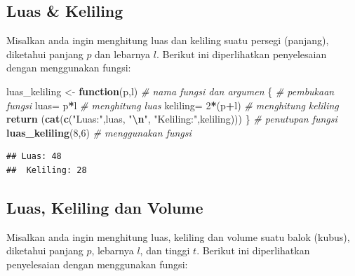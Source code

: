 \documentclass[
]{book}
\newenvironment{Shaded}{\begin{snugshade}}{\end{snugshade}}
\newcommand{\CommentTok}[1]{\textcolor[rgb]{0.56,0.35,0.01}{\textit{#1}}}
\newcommand{\ControlFlowTok}[1]{\textcolor[rgb]{0.13,0.29,0.53}{\textbf{#1}}}
\newcommand{\DecValTok}[1]{\textcolor[rgb]{0.00,0.00,0.81}{#1}}
\newcommand{\FunctionTok}[1]{\textcolor[rgb]{0.13,0.29,0.53}{\textbf{#1}}}
\newcommand{\NormalTok}[1]{#1}
\newcommand{\OtherTok}[1]{\textcolor[rgb]{0.56,0.35,0.01}{#1}}
\newcommand{\SpecialCharTok}[1]{\textcolor[rgb]{0.81,0.36,0.00}{\textbf{#1}}}
\newcommand{\StringTok}[1]{\textcolor[rgb]{0.31,0.60,0.02}{#1}}
\begin{document}
\hypertarget{luas-keliling}{%
\subsection{Luas \& Keliling}\label{luas-keliling}}

Misalkan anda ingin menghitung luas dan keliling suatu persegi (panjang), diketahui panjang \(p\) dan lebarnya \(l\). Berikut ini diperlihatkan penyelesaian dengan menggunakan fungsi:

\begin{Shaded}
\begin{Highlighting}[]
\NormalTok{luas\_keliling }\OtherTok{\textless{}{-}} \ControlFlowTok{function}\NormalTok{(p,l)               }\CommentTok{\# nama fungsi dan argumen}
\NormalTok{\{                                            }\CommentTok{\# pembukaan fungsi}
\NormalTok{  luas}\OtherTok{=}\NormalTok{ p}\SpecialCharTok{*}\NormalTok{l                                  }\CommentTok{\# menghitung luas}
\NormalTok{  keliling}\OtherTok{=} \DecValTok{2}\SpecialCharTok{*}\NormalTok{(p}\SpecialCharTok{+}\NormalTok{l)                          }\CommentTok{\# menghitung keliling}
  \FunctionTok{return}\NormalTok{ (}\FunctionTok{cat}\NormalTok{(}\FunctionTok{c}\NormalTok{(}\StringTok{"Luas:"}\NormalTok{,luas, }\StringTok{"}\SpecialCharTok{\textbackslash{}n}\StringTok{"}\NormalTok{, }
             \StringTok{"Keliling:"}\NormalTok{,keliling)))  }
\NormalTok{\}                                            }\CommentTok{\# penutupan fungsi}
\FunctionTok{luas\_keliling}\NormalTok{(}\DecValTok{8}\NormalTok{,}\DecValTok{6}\NormalTok{)                           }\CommentTok{\# menggunakan fungsi}
\end{Highlighting}
\end{Shaded}

\begin{verbatim}
## Luas: 48 
##  Keliling: 28
\end{verbatim}

\hypertarget{luas-keliling-dan-volume}{%
\subsection{Luas, Keliling dan Volume}\label{luas-keliling-dan-volume}}

Misalkan anda ingin menghitung luas, keliling dan volume suatu balok (kubus), diketahui panjang \(p\), lebarnya \(l\), dan tinggi \(t\). Berikut ini diperlihatkan penyelesaian dengan menggunakan fungsi:
\end{document}
